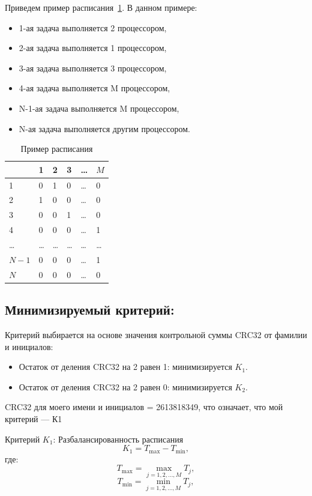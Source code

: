 \documentclass[openany, twoside, a4paper, 12pt]{extbook}
\begin{document}
	Приведем пример расписания~\ref{rasp}. 
	В данном примере:
	\begin{itemize}
		\item 1-ая задача выполняется 2 процессором, 
		\item 2-ая задача выполняется 1 процессором,
		\item 3-ая задача выполняется 3 процессором,
		\item 4-ая задача выполняется M процессором,
		\item N-1-ая задача выполняется M процессором,
		\item N-ая задача выполняется другим процессором.
	\end{itemize}
	\begin{table}
			\begin{tabular}{|p{1.8cm}|p{1.8cm}|p{1.8cm}|p{1.8cm}|p{1.8cm}|p{1.8cm}|} 
		\hline
		& 1 & 2 & 3 & \ldots & $ M $ \\ 
		\hline
			1 & 0 & 1 & 0 & \ldots & 0 \\ 
		\hline
			2 & 1 & 0 & 0 & \ldots & 0 \\ 
		\hline
			3 & 0 & 0 & 1 & \ldots & 0 \\ 
		\hline
			4 & 0 & 0 & 0 & \ldots & 1 \\ 
		\hline
			\ldots & \ldots  & \ldots  & \ldots  & \ldots & \ldots  \\ 	
		\hline
			$N-1$ & 0 & 0 & 0 & \ldots & 1 \\ 
		\hline
			$N$ & 0 & 0 & 0 & \ldots & 0\\ 
		\hline
	\end{tabular}
		\caption{Пример расписания}
		\label{rasp}
	\end{table}

	\subsection*{Минимизируемый критерий:}
		
	Критерий выбирается на основе значения контрольной суммы CRC32 от фамилии и инициалов:
	\begin{itemize}
		\label{cr1}
	    \item Остаток от деления CRC32 на 2 равен 1: минимизируется \( K_1 \).
	    \item Остаток от деления CRC32 на 2 равен 0: минимизируется \( K_2 \).
	\end{itemize}
	CRC32 для моего имени и инициалов = 2613818349, что означает, что мой критерий --- К1
	

	Критерий \( K_1 \): Разбалансированность расписания
	\[
	K_1 = T_{\text{max}} - T_{\text{min}},
	\]
	где:
	\[
	T_{\text{max}} = \max_{j=1, 2, \dots, M} T_j,
	\]
	\[
	T_{\text{min}} = \min_{j=1, 2, \dots, M} T_j,
	\]
\end{document}

